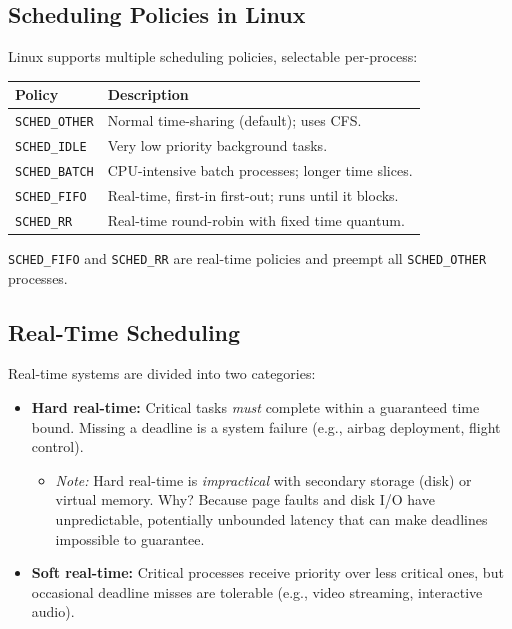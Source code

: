 \documentclass[11pt]{article}
\begin{document}
\subsection{Scheduling Policies in Linux}

Linux supports multiple scheduling policies, selectable per-process:

\begin{center}
\begin{tabular}{ll}
\toprule
\textbf{Policy} & \textbf{Description} \\
\midrule
\texttt{SCHED\_OTHER} & Normal time-sharing (default); uses CFS. \\
\texttt{SCHED\_IDLE}  & Very low priority background tasks. \\
\texttt{SCHED\_BATCH} & CPU-intensive batch processes; longer time slices. \\
\texttt{SCHED\_FIFO}  & Real-time, first-in first-out; runs until it blocks. \\
\texttt{SCHED\_RR}    & Real-time round-robin with fixed time quantum. \\
\bottomrule
\end{tabular}
\end{center}

\texttt{SCHED\_FIFO} and \texttt{SCHED\_RR} are real-time policies and preempt all \texttt{SCHED\_OTHER} processes.

\subsection{Real-Time Scheduling}

Real-time systems are divided into two categories:

\begin{itemize}
    \item \textbf{Hard real-time:} Critical tasks \emph{must} complete within a guaranteed time bound. Missing a deadline is a system failure (e.g., airbag deployment, flight control).
    \begin{itemize}
        \item \emph{Note:} Hard real-time is \emph{impractical} with secondary storage (disk) or virtual memory. Why? Because page faults and disk I/O have unpredictable, potentially unbounded latency that can make deadlines impossible to guarantee.
    \end{itemize}
    \item \textbf{Soft real-time:} Critical processes receive priority over less critical ones, but occasional deadline misses are tolerable (e.g., video streaming, interactive audio).
\end{itemize}
\end{document}
